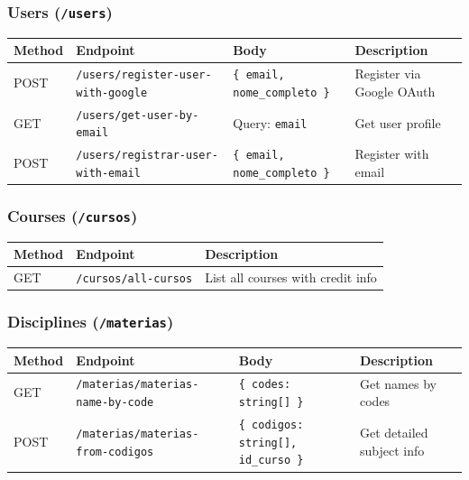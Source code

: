 \documentclass[11pt,a4paper]{article}
\newcommand{\code}[1]{\texttt{#1}}
\begin{document}
\subsubsection*{Users (\code{/users})}
\begin{center}
\begin{longtable}{@{}L{1.5cm}L{4.5cm}L{3.5cm}L{3cm}@{}}
\toprule
\textbf{Method} & \textbf{Endpoint} & \textbf{Body} & \textbf{Description} \\
\midrule
\endhead
POST & \code{/users/register-user-with-google}  & \code{\{ email, nome\_completo \}} & Register via Google OAuth \\
GET  & \code{/users/get-user-by-email}           & Query: \code{email}               & Get user profile \\
POST & \code{/users/registrar-user-with-email}   & \code{\{ email, nome\_completo \}} & Register with email \\
\bottomrule
\end{longtable}
\end{center}

\subsubsection*{Courses (\code{/cursos})}
\begin{center}
\begin{longtable}{@{}L{1.5cm}L{4cm}L{6cm}@{}}
\toprule
\textbf{Method} & \textbf{Endpoint} & \textbf{Description} \\
\midrule
\endhead
GET & \code{/cursos/all-cursos} & List all courses with credit info \\
\bottomrule
\end{longtable}
\end{center}

\subsubsection*{Disciplines (\code{/materias})}
\begin{center}
\begin{longtable}{@{}L{1.5cm}L{4.5cm}L{4cm}L{3cm}@{}}
\toprule
\textbf{Method} & \textbf{Endpoint} & \textbf{Body} & \textbf{Description} \\
\midrule
\endhead
GET  & \code{/materias/materias-name-by-code} & \code{\{ codes: string[] \}}             & Get names by codes \\
POST & \code{/materias/materias-from-codigos} & \code{\{ codigos: string[], id\_curso \}} & Get detailed subject info \\
\bottomrule
\end{longtable}
\end{center}
\end{document}
